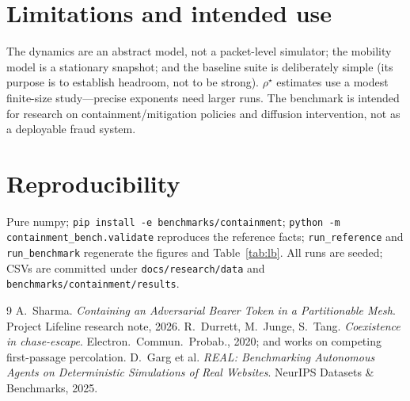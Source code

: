 \documentclass[11pt]{article}
\newcommand{\rhoc}{\rho^\star}
\begin{document}
\section{Limitations and intended use}
The dynamics are an abstract model, not a packet-level simulator; the mobility model
is a stationary snapshot; and the baseline suite is deliberately simple (its purpose
is to establish headroom, not to be strong). $\rhoc$ estimates use a modest
finite-size study---precise exponents need larger runs. The benchmark is intended for
research on containment/mitigation policies and diffusion intervention, not as a
deployable fraud system.

\section{Reproducibility}
Pure numpy; \texttt{pip install -e benchmarks/containment}; \texttt{python -m
containment\_bench.validate} reproduces the reference facts; \texttt{run\_reference}
and \texttt{run\_benchmark} regenerate the figures and Table~\ref{tab:lb}. All runs
are seeded; CSVs are committed under \texttt{docs/research/data} and
\texttt{benchmarks/containment/results}.

\begin{thebibliography}{9}
 A.~Sharma. \emph{Containing an Adversarial Bearer Token in a
Partitionable Mesh}. Project Lifeline research note, 2026.
 R.~Durrett, M.~Junge, S.~Tang. \emph{Coexistence in
chase-escape}. Electron.\ Commun.\ Probab., 2020; and works on competing
first-passage percolation.
 D.~Garg et al. \emph{REAL: Benchmarking Autonomous Agents on
Deterministic Simulations of Real Websites}. NeurIPS Datasets \& Benchmarks, 2025.
\end{thebibliography}
\end{document}
